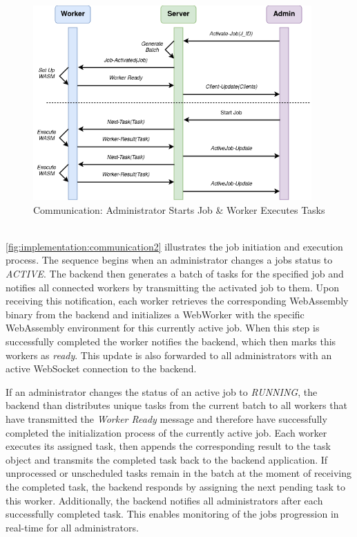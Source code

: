 \begin{figure}[htbp]
    \centering
    \includegraphics[width=0.95\textwidth]{gfx/figures/communication-jobexecution.png}
    \caption{Communication: Administrator Starts Job \& Worker Executes Tasks}
    \label{fig:implementation:communication2}
\end{figure}
~\\
\autoref{fig:implementation:communication2} illustrates the job initiation and execution process. The sequence begins when an administrator changes a jobs status to \emph{ACTIVE}. The backend then generates a batch of tasks for the specified job and notifies all connected workers by transmitting the activated job to them. Upon receiving this notification, each worker retrieves the corresponding WebAssembly binary from the backend and initializes a WebWorker with the specific WebAssembly environment for this currently active job. When this step is successfully completed the worker notifies the backend, which then marks this workers as \emph{ready}. This update is also forwarded to all administrators with an active WebSocket connection to the backend.

If an administrator changes the status of an active job to \emph{RUNNING}, the backend than distributes unique tasks from the current batch to all workers that have transmitted the \emph{Worker Ready} message and therefore have successfully completed the initialization process of the currently active job. Each worker executes its assigned task, then appends the corresponding result to the task object and transmits the completed task back to the backend application. If unprocessed or unscheduled tasks remain in the batch at the moment of receiving the completed task, the backend responds by assigning the next pending task to this worker. Additionally, the backend notifies all administrators after each successfully completed task. This enables monitoring of the jobs progression in real-time for all administrators.

